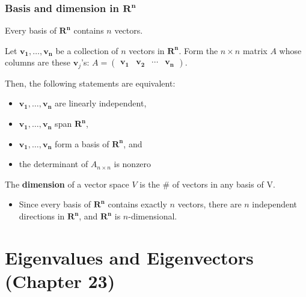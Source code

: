 \documentclass[10pt, handout]{beamer}
\begin{document}
\begin{frame}
\frametitle{Basis and dimension in $\mathbf{R^n}$} \vskip 0.1in

\begin{theorem}[11.7]
Every basis of $\mathbf{R^n}$ contains $n$ vectors.
\end{theorem}

\begin{theorem}[11.8]
Let $\mathbf{v_1}, \ldots , \mathbf{v_n}$ be a collection of $n$ vectors in $\mathbf{R^n}$. Form the $n \times n$ matrix $A$ whose columns are these $\mathbf{v}_{j}$'s: $A = \begin{pmatrix} \mathbf{v_1} &  \mathbf{v_2} & \cdots & \mathbf{v_n} \end{pmatrix}$. 

Then, the following statements are equivalent:
\begin{itemize}
\item[(a)] $\mathbf{v_1}, \ldots , \mathbf{v_n}$ are linearly independent,
\item[(b)] $\mathbf{v_1}, \ldots , \mathbf{v_n}$ span $\mathbf{R^n}$,
\item[(c)]  $\mathbf{v_1}, \ldots , \mathbf{v_n}$ form a basis of $\mathbf{R^n}$, and
\item[(d)] the determinant of $A_{n \times n}$ is nonzero
\end{itemize} 
\end{theorem}

The \textbf{dimension} of a vector space $V$ is the \# of vectors in any basis of V.

\begin{itemize}
\item[] Since every basis of $\mathbf{R^n}$ contains exactly $n$ vectors, there are $n$ independent directions in $\mathbf{R^n}$, and $\mathbf{R^n}$ is $n$-dimensional.
\end{itemize} 

\end{frame}


\section{Eigenvalues and Eigenvectors (Chapter 23)}
\end{document}
